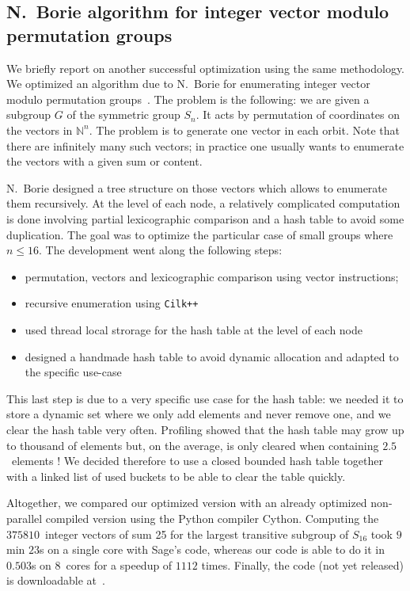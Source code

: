 \documentclass{deliverablereport}
\newcommand{\CilkP}{\texttt{Cilk++}\xspace}
\newcommand{\NN}{\mathbb{N}}
\begin{document}
\subsection{N.~Borie algorithm for integer vector modulo permutation groups}

We briefly report on another successful optimization using the same
methodology. We optimized an algorithm due to N.~Borie for enumerating integer
vector modulo permutation groups~\cite{Borie}. The problem is the following:
we are given a subgroup $G$ of the symmetric group $S_n$. It acts by
permutation of coordinates on the vectors in $\NN^n$. The problem is to
generate one vector in each orbit. Note that there are infinitely many such
vectors; in practice one usually wants to enumerate the vectors with a given
sum or content. 

N.~Borie designed a tree structure on those vectors which allows to enumerate
them recursively. At the level of each node, a relatively complicated
computation is done involving partial lexicographic comparison and a hash
table to avoid some duplication. The goal was to optimize the particular case
of small groups where $n\leq16$. The development went along the following
steps:
\begin{itemize}
\item permutation, vectors and lexicographic comparison using vector
  instructions;
\item recursive enumeration using \CilkP
\item used thread local strorage for the hash table at the level of each node
\item designed a handmade hash table to avoid dynamic allocation and adapted
  to the specific use-case
\end{itemize}
This last step is due to a very specific use case for the hash table: we
needed it to store a dynamic set where we only add elements and never remove
one, and we clear the hash table very often. Profiling showed that the hash
table may grow up to thousand of elements but, on the average, is
only cleared when containing $2.5$~elements ! We decided therefore to use a
closed bounded hash table together with a linked list of used buckets to be
able to clear the table quickly.

Altogether, we compared our optimized version with an already optimized
non-parallel compiled version using the Python compiler Cython. Computing the
$375810$~integer vectors of sum 25 for the largest transitive subgroup of
$S_{16}$ took $9$min $23$s on a single core with Sage's code, whereas our code
is able to do it in $0.503$s on $8$~cores for a speedup of $1112$ times.
Finally, the code (not yet released) is downloadable at~\cite{IVMPG}.
\end{document}
